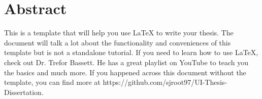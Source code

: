 \chapter{Abstract}
This is a template that will help you use \LaTeX\; to write your thesis. The document will talk a lot about the functionality and conveniences of this template but is not a standalone tutorial. If you need to learn how to use \LaTeX, check out Dr. Trefor Bassett. He has a great playlist on YouTube to teach you the basics and much more. If you happened across this document without the template, you can find more at https://github.com/sjroot97/UI-Thesis-Dissertation.

